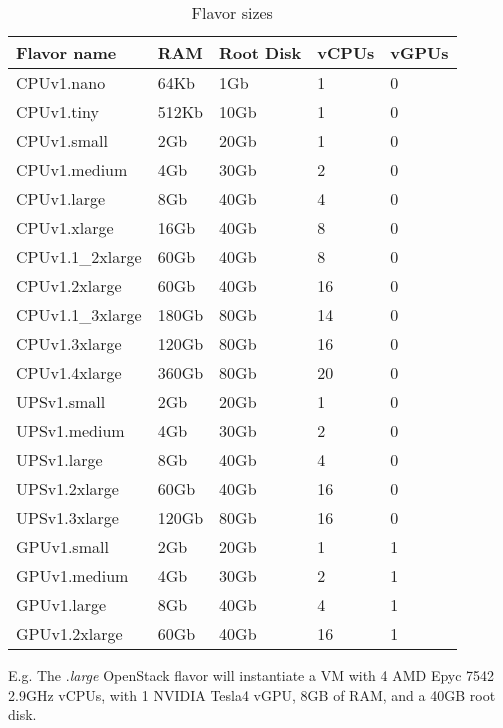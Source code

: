 \begin{table}[h!]
\centering
\begin{tabular}{ |p{3cm}|p{3cm}|p{3cm}|p{3cm}|p{3cm}| }
  \hline
  \rowcolor{lightgray} \textbf{Flavor name} & \textbf{RAM} & \textbf{Root Disk} & \textbf{vCPUs} & \textbf{vGPUs} \\
  \hline
  CPUv1.nano & 64Kb & 1Gb & 1 & 0 \\
  \hline
  CPUv1.tiny & 512Kb & 10Gb & 1 & 0 \\
  \hline
  CPUv1.small & 2Gb & 20Gb & 1 & 0 \\
  \hline
  CPUv1.medium & 4Gb & 30Gb & 2 & 0 \\
  \hline
  CPUv1.large & 8Gb & 40Gb & 4 & 0 \\
  \hline
  CPUv1.xlarge & 16Gb & 40Gb & 8 & 0 \\
  \hline
  CPUv1.1_2xlarge & 60Gb & 40Gb & 8 & 0 \\
  \hline
  CPUv1.2xlarge & 60Gb & 40Gb & 16 & 0 \\  
  \hline
  CPUv1.1_3xlarge & 180Gb & 80Gb & 14 & 0 \\
  \hline
  CPUv1.3xlarge & 120Gb & 80Gb & 16 & 0 \\
  \hline
  CPUv1.4xlarge & 360Gb & 80Gb & 20 & 0 \\
  \hline
  UPSv1.small & 2Gb & 20Gb & 1 & 0 \\
  \hline
  UPSv1.medium & 4Gb & 30Gb & 2 & 0 \\
  \hline
  UPSv1.large & 8Gb & 40Gb & 4 & 0 \\
  \hline
  UPSv1.2xlarge & 60Gb & 40Gb & 16 & 0 \\
  \hline
  UPSv1.3xlarge & 120Gb & 80Gb & 16 & 0 \\
  \hline
  GPUv1.small & 2Gb & 20Gb & 1 & 1 \\
  \hline
  GPUv1.medium & 4Gb & 30Gb & 2 & 1 \\
  \hline
  GPUv1.large & 8Gb & 40Gb & 4 & 1 \\
  \hline
  GPUv1.2xlarge & 60Gb & 40Gb & 16 & 1 \\
  \hline
\end{tabular}
\caption{Flavor sizes}
\label{table:flavor-size}
\end{table}


E.g. The .\emph{large} OpenStack flavor will instantiate a
VM with 4 AMD Epyc 7542 2.9GHz vCPUs, with 1 NVIDIA Tesla4 vGPU, 8GB
of RAM, and a 40GB root disk.


